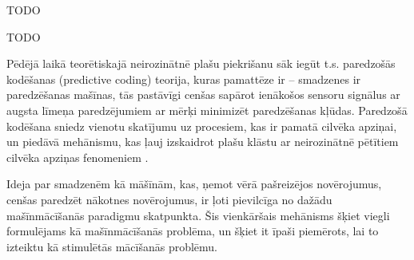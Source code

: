 \documentclass{ludis} %
\begin{document}
\maketitle

\begin{abstract-lv}
  TODO

\end{abstract-lv}
\clearpage

\begin{abstract-en}
  TODO

\end{abstract-en}


\tableofcontents

Pēdējā laikā teorētiskajā neirozinātnē plašu piekrišanu sāk iegūt t.s.
paredzošās kodēšanas (predictive coding) teorija, kuras pamattēze ir --
smadzenes ir paredzēšanas mašīnas, tās pastāvīgi cenšas sapārot ienākošos
sensoru signālus ar augsta līmeņa paredzējumiem ar mērķi minimizēt paredzēšanas
kļūdas. Paredzošā kodēšana sniedz vienotu skatījumu uz procesiem, kas ir pamatā
cilvēka apziņai, un piedāvā mehānismu, kas ļauj izskaidrot plašu klāstu ar
neirozinātnē pētītiem cilvēka apziņas fenomeniem \autocite{Clark2013}.

Ideja par smadzenēm kā māšīnām, kas, ņemot vērā pašreizējos novērojumus, cenšas
paredzēt nākotnes novērojumus, ir ļoti pievilcīga no dažādu mašīnmācīšanās
paradigmu skatpunkta. Šis vienkāršais mehānisms šķiet viegli formulējams kā
mašīnmācīšanās problēma, un šķiet it īpaši piemērots, lai to izteiktu kā
stimulētās mācīšanās problēmu.
\end{document}
